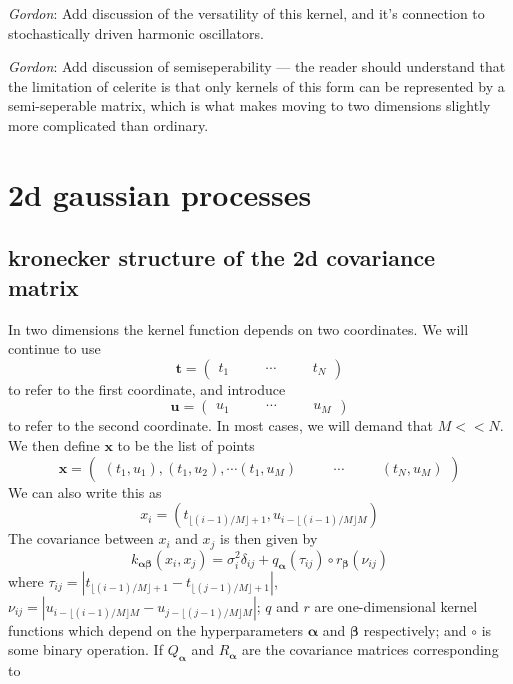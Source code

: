 \documentclass[modern]{aastex62}
\newcommand{\todo}[3]{{\color{#2}\emph{#1}: #3}}
\newcommand{\gordontodo}[1]{\todo{Gordon}{red}{#1}}
\newcommand{\project}[1]{\textsf{#1}}
\newcommand{\celerite}{\project{celerite }}
\newcommand{\bvec}[1]{{\ensuremath{\boldsymbol{#1}}}}
\newcommand{\expandvec}[2]{\left(\begin{array}{ccccc} #1\quad && \cdots\quad && #2 \end{array}\right)}
\begin{document}
		\gordontodo{Add discussion of the versatility of this kernel, and it's connection to stochastically driven harmonic oscillators.}
		
		\gordontodo{Add discussion of semiseperability --- the reader should understand that the limitation of \celerite is that only kernels of this form can be 
		represented by a semi-seperable matrix, which is what makes moving to two dimensions slightly more complicated than ordinary.}
		

\section{2d gaussian processes}
	\subsection{kronecker structure of the 2d covariance matrix}
	In two dimensions the kernel function depends on two coordinates. We will continue to use
	\begin{equation}
		\bvec{t} = \expandvec{t_1}{t_N}
	\end{equation}
	to refer to the first coordinate, and introduce
	\begin{equation}
		\bvec{u} = \expandvec{u_1}{u_M}
	\end{equation}
	to refer to the second coordinate. In most cases, we will demand that $M << N$. We then define $\bvec{x}$ to be the list of points
	\begin{equation}
		\bvec{x} = \expandvec{(t_1, u_1), (t_1, u_2), \cdots (t_1, u_M)}{(t_N, u_M)}
	\end{equation}
	We can also write this as
	\begin{equation}
		x_i = (t_{\lfloor(i-1)/M\rfloor + 1}, u_{i - \lfloor(i-1)/M\rfloor M})
	\end{equation} 
	The covariance between $x_i$ and $x_j$ is then given by
	\begin{equation}
		k_{\bvec{\alpha}\bvec{\beta}}(x_i, x_j) = \sigma_i^2\delta_{ij} + q_\bvec{\alpha}(\tau_{ij})\circ r_\bvec{\beta}(\nu_{ij})
	\end{equation}
	where $\tau_{ij} = |t_{\lfloor(i-1)/M\rfloor + 1}-t_{\lfloor(j-1)/M\rfloor + 1}|$, 
	$\nu_{ij} = |u_{i - \lfloor(i-1)/M\rfloor M}-u_{j - \lfloor(j-1)/M\rfloor M}|$; 
	$q$ and $r$ are one-dimensional kernel functions which depend on the hyperparameters $\bvec{\alpha}$ and 
	$\bvec{\beta}$ respectively; 
	and $\circ$ is some binary operation. 
	If $Q_\bvec{\alpha}$ and $R_\bvec{\alpha}$ are the covariance matrices corresponding to 
\end{document}
